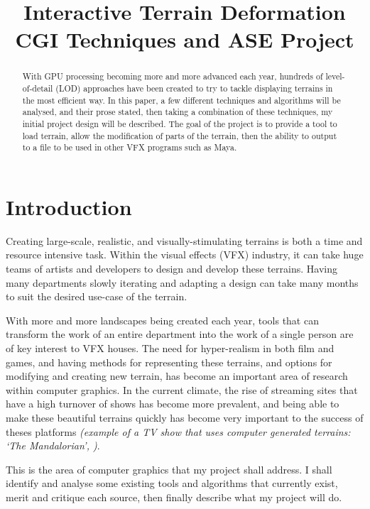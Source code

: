 \documentclass[notitlepage,12pt]{article}
\title{%
Interactive Terrain Deformation \\
\large CGI Techniques and ASE Project}
\date{}
\begin{document}
\maketitle

\thispagestyle{empty}

\begin{abstract}
\noindent With GPU processing becoming more and more advanced each year, hundreds of level-of-detail (LOD) approaches have been created to try to tackle displaying terrains in the most efficient way. In this paper, a few different techniques and algorithms will be analysed, and their prose stated, then taking a combination of these techniques, my initial project design will be described. The goal of the project is to provide a tool to load terrain, allow the modification of parts of the terrain, then the ability to output to a file to be used in other VFX programs such as Maya.
\end{abstract}

\newpage
\clearpage
\setcounter{page}{1}

\section{Introduction}

Creating large-scale, realistic, and visually-stimulating terrains is both a time and resource intensive task. Within the visual effects (VFX) industry, it can take huge teams of artists and developers to design and develop these terrains. Having many departments slowly iterating and adapting a design can take many months to suit the desired use-case of the terrain.

With more and more landscapes being created each year, tools that can transform the work of an entire department into the work of a single person are of key interest to VFX houses. The need for hyper-realism in both film and games, and having methods for representing these terrains, and options for modifying and creating new terrain, has become an important area of research within computer graphics. In the current climate, the rise of streaming sites that have a high turnover of shows has become more prevalent, and being able to make these beautiful terrains quickly has become very important to the success of theses platforms \textit{(example of a TV show that uses computer generated terrains: `The Mandalorian', \cite{mandalorian})}.

This is the area of computer graphics that my project shall address. I shall identify and analyse some existing tools and algorithms that currently exist, merit and critique each source, then finally describe what my project will do.
\end{document}
